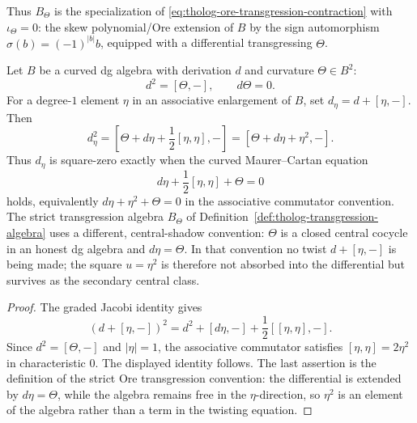 Thus \(B_{\Theta}\) is the specialization of
\eqref{eq:tholog-ore-transgression-contraction} with
\(\iota_{\Theta}=0\): the skew polynomial/Ore extension of \(B\) by the
sign automorphism \(\sigma(b)=(-1)^{|b|}b\), equipped with a
differential transgressing \(\Theta\).

\begin{proposition}
\label{prop:tholog-curved-mc-convention}
Let \(B\) be a curved dg algebra with derivation \(d\) and curvature
\(\Theta\in B^{2}\):
\[
d^{2}=[\Theta,-],
\qquad d\Theta=0.
\]
For a degree-\(1\) element \(\eta\) in an associative enlargement of
\(B\), set \(d_{\eta}=d+[\eta,-]\). Then
\[
d_{\eta}^{2}
=
\left[\Theta+d\eta+\frac12[\eta,\eta],-\right]
=
\left[\Theta+d\eta+\eta^{2},-\right].
\]
Thus \(d_{\eta}\) is square-zero exactly when the curved Maurer--Cartan
equation
\[
d\eta+\frac12[\eta,\eta]+\Theta=0
\]
holds, equivalently \(d\eta+\eta^{2}+\Theta=0\) in the associative
commutator convention. The strict transgression algebra
\(B_{\Theta}\) of Definition~\ref{def:tholog-transgression-algebra}
uses a different, central-shadow convention: \(\Theta\) is a closed
central cocycle in an honest dg algebra and \(d\eta=\Theta\). In that
convention no twist \(d+[\eta,-]\) is being made; the square
\(u=\eta^{2}\) is therefore not absorbed into the differential but
survives as the secondary central class.
\end{proposition}

\begin{proof}
The graded Jacobi identity gives
\[
(d+[\eta,-])^{2}
=d^{2}+[d\eta,-]+\frac12[[\eta,\eta],-].
\]
Since \(d^{2}=[\Theta,-]\) and \(|\eta|=1\), the associative
commutator satisfies \([\eta,\eta]=2\eta^{2}\) in characteristic
\(0\). The displayed identity follows. The last assertion is the
definition of the strict Ore transgression convention: the differential
is extended by \(d\eta=\Theta\), while the algebra remains free in the
\(\eta\)-direction, so \(\eta^{2}\) is an element of the algebra rather
than a term in the twisting equation.
\end{proof}

